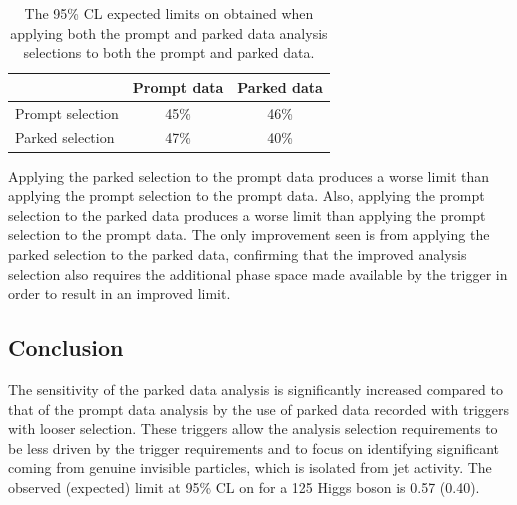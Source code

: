 \begin{table}
  \caption{The 95\% \ac{CL} expected limits on \BRinv obtained when applying both the prompt and parked data analysis selections to both the prompt and parked data.}
  \label{tab:promptvsparked}
  \begin{tabular}{lcc}
    \hline\hline
    & Prompt data & Parked data \\
    \hline
    Prompt selection & 45\% & 46\% \\
    Parked selection & 47\% & 40\% \\
    \hline\hline
  \end{tabular}
\end{table}

Applying the parked selection to the prompt data produces a worse limit than applying the prompt selection to the prompt data. Also, applying the prompt selection to the parked data produces a worse limit than applying the prompt selection to the prompt data. The only improvement seen is from applying the parked selection to the parked data, confirming that the improved analysis selection also requires the additional phase space made available by the trigger in order to result in an improved limit.

\subsection{Conclusion}
The sensitivity of the parked data analysis is significantly increased compared to that of the prompt data analysis by the use of parked data recorded with triggers with looser selection. These triggers allow the analysis selection requirements to be less driven by the trigger requirements and to focus on identifying significant \MET coming from genuine invisible particles, which is isolated from jet activity. The observed (expected) limit at 95\% \ac{CL} on \BRinv for a 125 \GeV Higgs boson is 0.57 (0.40).
